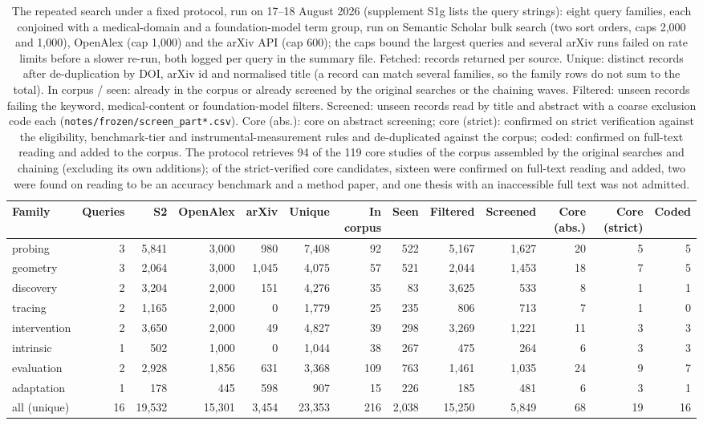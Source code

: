 \begin{table}[!tbp]
\centering\scriptsize\setlength\tabcolsep{3pt}\renewcommand{\arraystretch}{0.95}
\caption{The repeated search under a fixed protocol, run on 17--18 August 2026 (supplement S1g lists the query strings): eight query families, each conjoined with a medical-domain and a foundation-model term group, run on Semantic Scholar bulk search (two sort orders, caps 2,000 and 1,000), OpenAlex (cap 1,000) and the arXiv API (cap 600); the caps bound the largest queries and several arXiv runs failed on rate limits before a slower re-run, both logged per query in the summary file. Fetched: records returned per source. Unique: distinct records after de-duplication by DOI, arXiv id and normalised title (a record can match several families, so the family rows do not sum to the total). In corpus / seen: already in the corpus or already screened by the original searches or the chaining waves. Filtered: unseen records failing the keyword, medical-content or foundation-model filters. Screened: unseen records read by title and abstract with a coarse exclusion code each (\texttt{notes/frozen/screen\_part*.csv}). Core (abs.): core on abstract screening; core (strict): confirmed on strict verification against the eligibility, benchmark-tier and instrumental-measurement rules and de-duplicated against the corpus; coded: confirmed on full-text reading and added to the corpus. The protocol retrieves 94 of the 119 core studies of the corpus assembled by the original searches and chaining (excluding its own additions); of the strict-verified core candidates, sixteen were confirmed on full-text reading and added, two were found on reading to be an accuracy benchmark and a method paper, and one thesis with an inaccessible full text was not admitted.}
\label{tab:frozen}
\begin{tabular}{@{}lrrrrrrrrrrrr@{}}
\toprule
Family & Queries & S2 & OpenAlex & arXiv & Unique & In corpus & Seen & Filtered & Screened & Core (abs.) & Core (strict) & Coded \\
\midrule
probing & 3 & 5,841 & 3,000 & 980 & 7,408 & 92 & 522 & 5,167 & 1,627 & 20 & 5 & 5 \\
geometry & 3 & 2,064 & 3,000 & 1,045 & 4,075 & 57 & 521 & 2,044 & 1,453 & 18 & 7 & 5 \\
discovery & 2 & 3,204 & 2,000 & 151 & 4,276 & 35 & 83 & 3,625 & 533 & 8 & 1 & 1 \\
tracing & 2 & 1,165 & 2,000 & 0 & 1,779 & 25 & 235 & 806 & 713 & 7 & 1 & 0 \\
intervention & 2 & 3,650 & 2,000 & 49 & 4,827 & 39 & 298 & 3,269 & 1,221 & 11 & 3 & 3 \\
intrinsic & 1 & 502 & 1,000 & 0 & 1,044 & 38 & 267 & 475 & 264 & 6 & 3 & 3 \\
evaluation & 2 & 2,928 & 1,856 & 631 & 3,368 & 109 & 763 & 1,461 & 1,035 & 24 & 9 & 7 \\
adaptation & 1 & 178 & 445 & 598 & 907 & 15 & 226 & 185 & 481 & 6 & 3 & 1 \\
\midrule
all (unique) & 16 & 19,532 & 15,301 & 3,454 & 23,353 & 216 & 2,038 & 15,250 & 5,849 & 68 & 19 & 16 \\
\bottomrule
\end{tabular}
\end{table}
